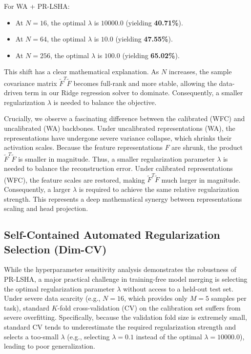 \documentclass{article}
\theoremstyle{plain}
\theoremstyle{definition}
\theoremstyle{remark}
\begin{document}
For WA + PR-LSHA:
\begin{itemize}
    \item At $N=16$, the optimal $\lambda$ is $10000.0$ (yielding \textbf{40.71\%}).
    \item At $N=64$, the optimal $\lambda$ is $10.0$ (yielding \textbf{47.55\%}).
    \item At $N=256$, the optimal $\lambda$ is $100.0$ (yielding \textbf{65.02\%}).
\end{itemize}

This shift has a clear mathematical explanation. As $N$ increases, the sample covariance matrix $\tilde{F}^T \tilde{F}$ becomes full-rank and more stable, allowing the data-driven term in our Ridge regression solver to dominate. Consequently, a smaller regularization $\lambda$ is needed to balance the objective. 

Crucially, we observe a fascinating difference between the calibrated (WFC) and uncalibrated (WA) backbones. Under uncalibrated representations (WA), the representations have undergone severe variance collapse, which shrinks their activation scales. Because the feature representations $F$ are shrunk, the product $\tilde{F}^T \tilde{F}$ is smaller in magnitude. Thus, a smaller regularization parameter $\lambda$ is needed to balance the reconstruction error. Under calibrated representations (WFC), the feature scales are restored, making $\tilde{F}^T \tilde{F}$ much larger in magnitude. Consequently, a larger $\lambda$ is required to achieve the same relative regularization strength. This represents a deep mathematical synergy between representations scaling and head projection.

\subsection{Self-Contained Automated Regularization Selection (Dim-CV)}
\label{sec:dim_cv}

While the hyperparameter sensitivity analysis demonstrates the robustness of PR-LSHA, a major practical challenge in training-free model merging is selecting the optimal regularization parameter $\lambda$ without access to a held-out test set. Under severe data scarcity (e.g., $N=16$, which provides only $M=5$ samples per task), standard $K$-fold cross-validation (CV) on the calibration set suffers from severe overfitting. Specifically, because the validation fold size is extremely small, standard CV tends to underestimate the required regularization strength and selects a too-small $\lambda$ (e.g., selecting $\lambda=0.1$ instead of the optimal $\lambda=10000.0$), leading to poor generalization.
\end{document}
